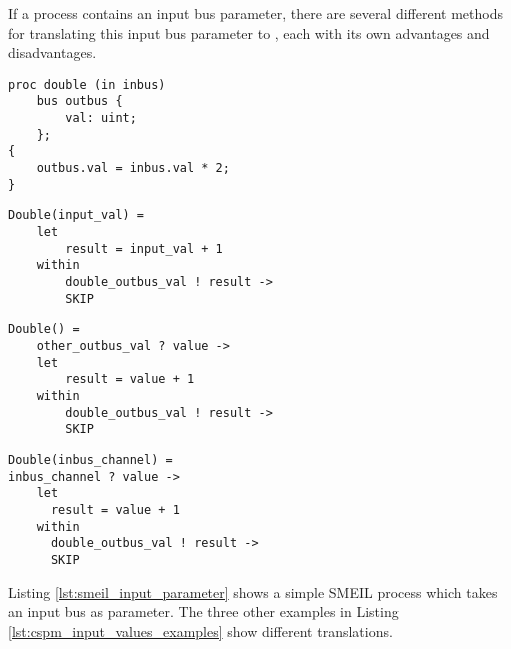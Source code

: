 If a process contains an input bus parameter, there are several different methods for translating this input bus parameter to \cspm{}, each with its own advantages and disadvantages.\\

\begin{minipage}[t]{.98\linewidth}
    \centering
\begin{minipage}[t]{0.45\linewidth}
  \begin{verbatim}
proc double (in inbus)
    bus outbus {
        val: uint;
    };
{
    outbus.val = inbus.val * 2;
}
  \end{verbatim}
  \label{lst:smeil_input_parameter}
\end{minipage}
\hspace{0.6cm}
\begin{minipage}[t]{0.45\linewidth}
\begin{verbatim}
Double(input_val) =
    let
        result = input_val + 1
    within
        double_outbus_val ! result ->
        SKIP

\end{verbatim}
\label{lst:cspm_input_value}
\end{minipage}
\hspace{0.6cm}
\newline
\begin{minipage}[t]{0.45\linewidth}
\begin{verbatim}
Double() =
    other_outbus_val ? value ->
    let
        result = value + 1
    within
        double_outbus_val ! result ->
        SKIP
\end{verbatim}
\label{lst:cspm_no_input}
\end{minipage}
\hspace{0.6cm}
\begin{minipage}[t]{0.45\linewidth}
\begin{verbatim}
Double(inbus_channel) =
inbus_channel ? value ->
    let
      result = value + 1
    within
      double_outbus_val ! result ->
      SKIP
\end{verbatim}
\label{lst:cspm_channel_reads_input}
\end{minipage}
\vspace{0.3cm}
\label{lst:cspm_input_values_examples}
\vspace{1cm}
\end{minipage}
Listing \ref{lst:smeil_input_parameter} shows a simple SMEIL process which takes an input bus as parameter. The three other examples in Listing \ref{lst:cspm_input_values_examples} show different translations.\\

